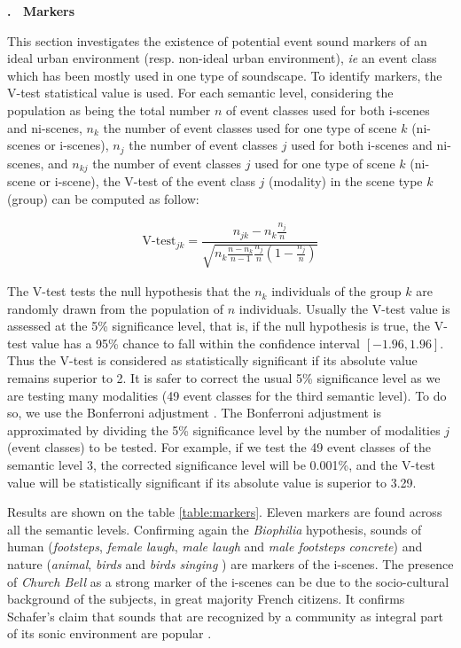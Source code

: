 \documentclass[12pt, titlepage, reqno]{article} %
\renewcommand{\subsection}[1]{\medskip \addtocounter{subsection}{1}\raggedright
    \textbf{\Alph{subsection}. \ #1} \medskip \setcounter{subsubsection}{0}\setlength{\parindent}{5ex}
}
\begin{document}
\subsection{Markers}



This section investigates the existence of potential event sound markers of an ideal urban environment (resp. non-ideal urban environment), \textit{ie} an event class which has been mostly used in one type of soundscape. To identify markers, the V-test statistical value is used. For each semantic level, considering the population as being  the total number  $n$ of event classes used for both i-scenes and ni-scenes, $n_k$ the number of event classes used for one type of scene $k$ (ni-scenes or i-scenes), $n_j$ the number of event classes $j$ used for both i-scenes and ni-scenes, and $n_{kj}$ the number of event classes $j$ used for one type of scene $k$ (ni-scene or i-scene), the V-test of the event class $j$ (modality) in the scene type $k$ (group) can be computed as follow:

\begin{align*}
\text{V-test}_{jk} = \dfrac{n_{jk} - n_k \frac{n_j}{n}}{\sqrt{n_k\frac{n-n_k}{n-1}\frac{n_j}{n}(1-\frac{n_j}{n})}} 
\end{align*}

The V-test tests the null hypothesis that the $n_k$ individuals of the group $k$ are randomly drawn from the population of $n$ individuals. Usually the V-test value is assessed at the 5\% significance level, that is, if the null hypothesis is true, the V-test value has a 95\% chance to fall within the confidence interval $[-1.96,1.96]$. Thus the V-test is considered as statistically significant if its absolute value remains superior to 2. It is safer to correct the usual 5\% significance level as we are testing many modalities (49 event classes for the third semantic level). To do so, we use the Bonferroni adjustment \cite{perneger1998s}. The Bonferroni adjustment is approximated by dividing the 5\% significance level by the number of modalities $j$ (event classes) to be tested. For example, if we test the 49 event classes of the semantic level 3, the corrected significance level will be 0.001\%, and the V-test value will be statistically significant if its absolute value is superior to 3.29.

Results are shown on the table \ref{table:markers}. Eleven markers are found across all the semantic levels. Confirming again the \textit{Biophilia} hypothesis, sounds of human (\textit{footsteps}, \textit{female laugh}, \textit{male laugh} and \textit{male footsteps concrete}) and nature (\textit{animal}, \textit{birds} and \textit{birds singing} ) are markers of the i-scenes. The presence of \textit{Church Bell} as a strong marker of the i-scenes can be due to the socio-cultural background of the subjects, in great majority French citizens. It confirms Schafer's claim that sounds that are recognized by a community as integral part of its sonic environment are popular \cite{schafer1977tuning}. 
\end{document}
